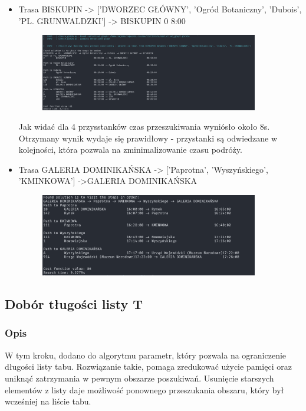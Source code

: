 \documentclass[a4paper, 12pt]{article}
\begin{document}
\begin{itemize}
    \item Trasa BISKUPIN -> ['DWORZEC GŁÓWNY', 'Ogród Botaniczny', 'Dubois', 'PL. GRUNWALDZKI'] -> BISKUPIN 0 8:00
  \begin{figure}[H]
    \centering
    \includegraphics[width=0.9\textwidth]{2024-04-08-07-36-38.png} 
  \end{figure}
  Jak widać dla 4 przysstanków czas przeszukiwania wyniósło około 8s.
  Otrzymany wynik wydaje się prawidłowy - przystanki są odwiedzane w kolejności,
  która pozwala na zminimalizowanie czasu podróży.


    \item Trasa GALERIA DOMINIKAŃSKA -> ['Paprotna', 'Wyszyńskiego', 'KMINKOWA'] ->GALERIA DOMINIKAŃSKA 
  \begin{figure}[H]
    \centering
    \includegraphics[width=0.9\textwidth]{2024-04-08-07-48-31.png} 
  \end{figure}
\end{itemize}


\subsection{Dobór tługości listy T}
    \subsubsection{Opis}
    W tym kroku, dodano do algorytmu parametr, który pozwala na ograniczenie długości listy tabu.
    Rozwiązanie takie, pomaga zredukować użycie pamięci oraz uniknąć zatrzymania w pewnym obszarze poszukiwań.
    Usunięcie starszych elementów z listy daje możliwość ponownego przeszukania obszaru, który był wcześniej
    na liście tabu. 
\end{document}
